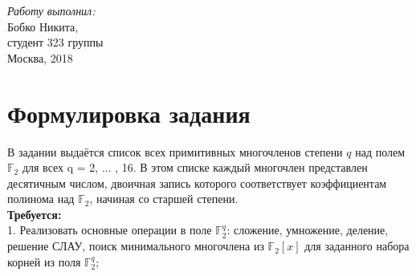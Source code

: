 \documentclass[12pt]{article}
\newcommand{\F}{\mathbb{F}_2}
\newcommand{\Fq}{\mathbb{F}_2^q}
\begin{document}
\begin{titlepage}
\Large \emph{Работу выполнил:}\\
Бобко Никита,\\
студент 323 группы\\[3cm] %


{\large Москва, 2018}\\[2cm] %


 

\vfill %

\end{titlepage}
    \newpage

    \tableofcontents
    \newpage

    \section{Формулировка задания}
        В задании выдаётся список всех примитивных многочленов степени $q$ над полем $\F$ для всех q = 2, ... , 16.
        В этом списке каждый многочлен представлен десятичным числом, двоичная запись которого соответствует
        коэффициентам полинома над $\F$, начиная со старшей степени.\\

        \textbf{Требуется:}\\
        1. Реализовать основные операции в поле $\Fq$: сложение, умножение, деление, решение СЛАУ, поиск 
        минимального многочлена из $\F[x]$ для заданного набора корней из поля $\Fq$; \\
\end{document}
